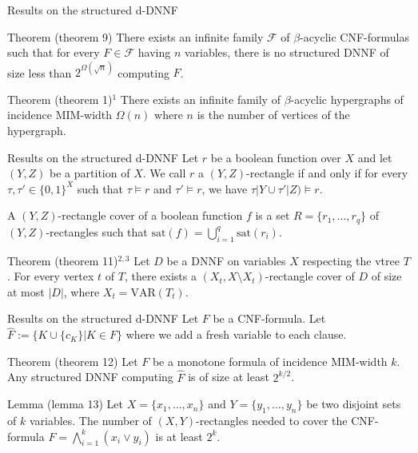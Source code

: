 \begin{frame}[t]{Results on the structured d-DNNF}
	\begin{block}{Theorem (theorem 9)}
		There exists an infinite family $\mathcal{F}$ of $\beta$-acyclic CNF-formulas such that for every $F\in \mathcal{F}$ having $n$ variables, there is no structured DNNF of size less than $2^{\Omega(\sqrt n)}$ computing $F$.
	\end{block}

	\begin{block}{Theorem (theorem 1)$^1$}
		There exists an infinite family of $\beta$-acyclic hypergraphs of incidence MIM-width $\Omega(n)$ where $n$ is the number of vertices of the hypergraph.
	\end{block}
\end{frame}

\begin{frame}[t]{Results on the structured d-DNNF}
	Let $r$ be a boolean function over $X$ and let $(Y, Z)$ be a partition of $X$. We call $r$ a $(Y, Z)$-rectangle if and only if for every $\tau, \tau' \in \{0, 1\}^X$ such that $\tau \models r$ and $\tau' \models r$, we have $\tau|Y \cup \tau'|Z) \models r$.

	A $(Y, Z)$-rectangle cover of a boolean function $f$ is a set $R = \{r_1, \dots, r_q\}$ of $(Y, Z)$-rectangles such that $\mathrm{sat}(f) = \bigcup_{i=1}^q \mathrm{sat}(r_i)$.
	\begin{block}{Theorem (theorem 11)$^{2,3}$}
		Let $D$ be a DNNF on variables $X$ respecting the vtree $T$. For every vertex $t$ of $T$, there exists a $(X_t, X \setminus X_t)$-rectangle cover of $D$ of size at most $|D|$, where $X_t = \mathrm{VAR}(T_t)$.
	\end{block}
\end{frame}

\begin{frame}[t]{Results on the structured d-DNNF}
	Let $F$ be a CNF-formula. Let $\hat{F} := \{K \cup \{c_K\} | K \in F\}$ where we add a fresh variable to each clause.
	\begin{block}{Theorem (theorem 12)}
		Let $F$ be a monotone formula of incidence MIM-width $k$. Any structured DNNF computing $\hat{F}$ is of size at least $2^{k/2}$.
	\end{block}

	\begin{block}{Lemma (lemma 13)}
		Let $X = \{x_1, \dots, x_n\}$ and $Y = \{y_1, \dots, y_n\}$ be two disjoint sets of $k$ variables. The number of $(X, Y)$-rectangles needed to cover the CNF-formula $F = \bigwedge^k_{i=1} (x_i\lor y_i)$ is at least $2^k$.
	\end{block}
\end{frame}
